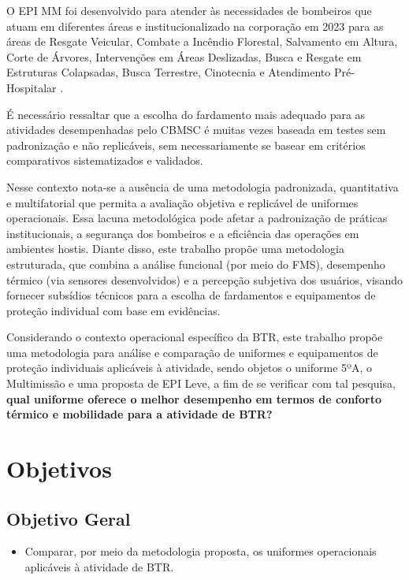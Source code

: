 		O \acrshort{EPI} \acrlong{MM} foi desenvolvido para atender às necessidades de bombeiros que atuam 
		em diferentes áreas e institucionalizado na corporação em 2023 para as áreas de Resgate 
		Veicular, Combate a Incêndio Florestal, Salvamento em Altura, Corte de Árvores, 
		Intervenções em Áreas Deslizadas, Busca e Resgate em Estruturas Colapsadas, Busca Terrestre, Cinotecnia 
		e Atendimento Pré-Hospitalar \cite{res16}. 
		
		É necessário ressaltar que a escolha do fardamento mais adequado para as atividades desempenhadas pelo
		\acrshort{CBMSC} é muitas vezes baseada em testes sem padronização e não replicáveis, sem 
		necessariamente se basear em critérios comparativos sistematizados e validados.

		Nesse contexto nota-se a ausência de uma metodologia padronizada, quantitativa e multifatorial que 
		permita a avaliação objetiva e replicável de uniformes operacionais. Essa lacuna metodológica 
		pode afetar a padronização de práticas institucionais, a segurança dos bombeiros e a eficiência 
		das operações em ambientes hostis. Diante disso, este trabalho propõe uma metodologia estruturada, 
		que combina a análise funcional (por meio do \acrfull{FMS}), desempenho térmico (via sensores 
		desenvolvidos) e a percepção subjetiva dos usuários, visando fornecer subsídios técnicos para 
		a escolha de fardamentos e equipamentos de proteção individual com base em evidências.

		Considerando o contexto operacional específico da \acrlong{BTR}, este trabalho propõe uma metodologia 
		para análise e comparação de uniformes e equipamentos de proteção individuais aplicáveis à 
		atividade, sendo objetos o uniforme 5ºA, o Multimissão e uma proposta de \acrshort{EPI} Leve, 
		a fim de se verificar com tal pesquisa, \textbf{qual uniforme oferece o melhor desempenho 
	 	em termos de conforto térmico e mobilidade para a atividade de \acrlong{BTR}?}

	\section{Objetivos}

		\subsection{Objetivo Geral}
			\begin{itemize}
				\item Comparar, por meio da metodologia proposta, os uniformes operacionais 
				aplicáveis à atividade de \acrlong{BTR}.
			\end{itemize}
